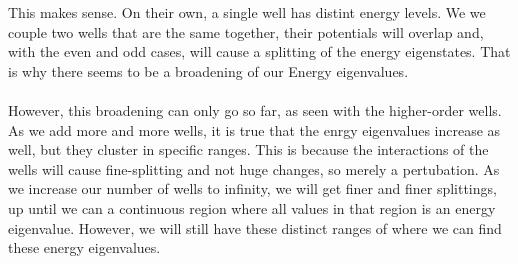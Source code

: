 \documentclass[10pt]{article} %
\begin{document}
\vspace{1em}
This makes sense. On their own, a single well has distint energy levels. We we couple two wells that are the same together, their potentials will overlap and, with the even and odd cases, will cause a splitting of the energy eigenstates. That is why there seems to be a broadening of our Energy eigenvalues.
\\ \\
\noindent However, this broadening can only go so far, as seen with the higher-order wells. As we add more and more wells, it is true that the enrgy eigenvalues increase as well, but they cluster in specific ranges. This is because the interactions of the wells will cause fine-splitting and not huge changes, so merely a pertubation. As we increase our number of wells to infinity, we will get finer and finer splittings, up until we can a continuous region where all values in that region is an energy eigenvalue. However, we will still have these distinct ranges of where we can find these energy eigenvalues.
\end{document}
